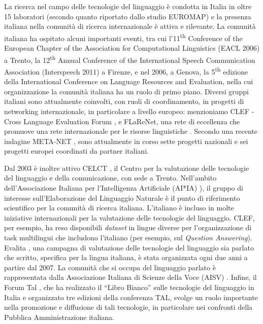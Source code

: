 \documentclass[]{../../metanetpaper}
\begin{document}
\begin{multicols}{2}
La ricerca nel campo delle tecnologie del linguaggio \`{e} condotta in Italia in oltre 15 laboratori (secondo quanto riportato dallo studio EUROMAP) e la presenza italiana nella comunit\`{a} di ricerca internazionale \`{e} attiva e rilevante. La comunit\`{a} italiana ha ospitato alcuni importanti eventi, tra cui l'11\textsuperscript{th} Conference of the European Chapter of the Association for Computational Linguistics (EACL 2006) a Trento, la 12\textsuperscript{th} Annual Conference of the International Speech Communication Association (Interspeech 2011) a Firenze, e nel 2006, a Genova, la 5\textsuperscript{th} edizione della International Conference on Language Resources and Evaluation, nella cui organizzazione la comunit\`{a} italiana ha un ruolo di primo piano. Diversi gruppi italiani sono attualmente coinvolti, con ruoli di coordinamento, in progetti di networking internazionale, in particolare a livello europeo: menzioniamo CLEF - Cross Language Evaluation Forum \cite{clef}, e FLaReNet, una rete di eccellenza che promuove una rete internazionale per le risorse linguistiche \cite{flarenet}. Secondo una recente indagine META-NET \cite{soria}, sono attualmente in corso sette progetti nazionali e sei progetti europei coordinati da partner italiani.

Dal 2003 \`{e} inoltre attivo CELCT \cite{celct}, il Centro per la valutazione delle tecnologie del linguaggio e della comunicazione, con sede a Trento. Nell'ambito dell'Associazione Italiana per l'Intelligenza Artificiale (AI*IA) \cite{aixia}), il gruppo di interesse sull'Elaborazione del Linguaggio Naturale \`{e} il punto di riferimento scientifico per la comunit\`{a} di ricerca italiana. L'italiano \`{e} incluso in molte iniziative internazionali per la valutazione delle tecnologie del linguaggio. CLEF, per esempio, ha reso disponibili \emph{dataset} in lingue diverse per l'organizzazione di task multilingui che includono l'italiano (per esempio, sul \emph{Question Answering}). Evalita \cite{evalita}, una campagna di valutazione delle tecnologie del linguaggio sia parlato che scritto, specifica per la lingua italiana, \`{e} stata organizzata ogni due anni a partire dal 2007. La comunit\`{a} che si occupa del linguaggio parlato \`{e} rappresentata dalla Associazione Italiana di Scienze della Voce (AISV) \cite{aisv}. Infine, il Forum Tal \cite{forumtal}, che ha realizzato il “Libro Bianco” sulle tecnologie del linguaggio in Italia e organizzato tre edizioni della conferenza TAL, svolge un ruolo importante nella promozione e diffusione di tali tecnologie, in particolare nei confronti della Pubblica Amministrazione italiana.


\end{multicols}
\end{document}
